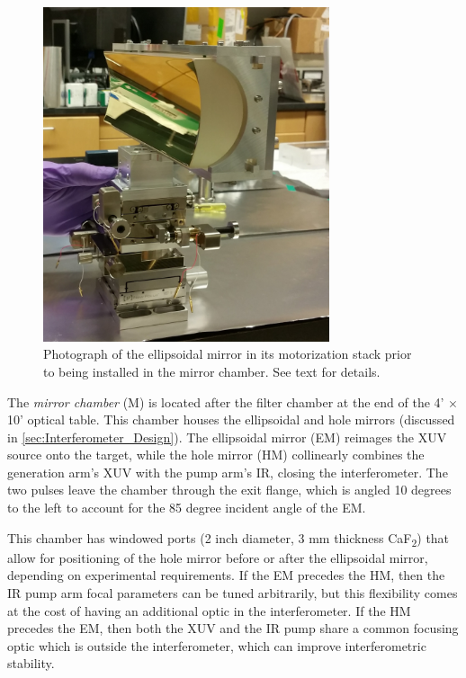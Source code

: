 \begin{figure}
	\centering
	\includegraphics[width=0.75\textwidth]{figures/chap2/EM_in_mount.jpg}
	\caption{Photograph of the ellipsoidal mirror in its motorization stack prior to being installed in the mirror chamber. See text for details.}
	\label{fig:EM_in_mount}
\end{figure}

The \textit{mirror chamber} (M) is located after the filter chamber at the end of the 4' $\times$ 10' optical table. This chamber houses the ellipsoidal and hole mirrors (discussed in \cref{sec:Interferometer_Design}). The ellipsoidal mirror (EM) reimages the XUV source onto the target, while the hole mirror (HM) collinearly combines the generation arm's XUV with the pump arm's IR, closing the interferometer. The two pulses leave the chamber through the exit flange, which is angled 10 degrees to the left to account for the 85 degree incident angle of the EM.

This chamber has windowed ports (2 inch diameter, 3 mm thickness CaF\textsubscript{2}) that allow for positioning of the hole mirror before or after the ellipsoidal mirror, depending on experimental requirements. If the EM precedes the HM, then the IR pump arm focal parameters can be tuned arbitrarily, but this flexibility comes at the cost of having an additional optic in the interferometer. If the HM precedes the EM, then both the XUV and the IR pump share a common focusing optic which is outside the interferometer, which can improve interferometric stability.

